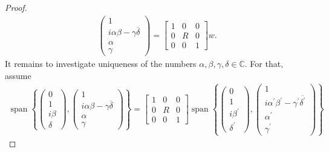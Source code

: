 \documentclass{amsart}
\newcommand{\C}{\mathbb{C}}
\DeclareMathOperator{\spann}{span}
\begin{document}
\begin{proof}
    \begin{align*}
        \begin{pmatrix}
                1 \\ i \alpha \beta - \gamma \overline{\delta} \\ \alpha \\ \gamma
            \end{pmatrix}
        =
        \left[\begin{array}{c|c|c}
            1& 0 & 0 \\
            \hline
            0 & R & 0 \\
            \hline 
            0 & 0 & 1
            \end{array}\right]
            w.
    \end{align*}
    It remains to investigate uniqueness of the numbers $\alpha, \beta, \gamma, \delta \in \C$. 
    For that, assume
    \begin{align*}
        \spann \left\{ \begin{pmatrix}
            0 \\ 1 \\ i \beta \\ \delta
        \end{pmatrix}, \begin{pmatrix}
            1 \\ i \alpha \beta - \gamma \overline{\delta} \\ \alpha \\ \gamma
        \end{pmatrix} \right\}
        = 
        \left[\begin{array}{c|c|c}
            1& 0 & 0 \\
            \hline
            0 & R & 0 \\
            \hline 
            0 & 0 & 1
            \end{array}\right]
            \spann \left\{ \begin{pmatrix}
                0 \\ 1 \\ i \beta^\prime \\ \delta^\prime
            \end{pmatrix}, \begin{pmatrix}
                1 \\ i \alpha^\prime \beta^\prime - \gamma^\prime \overline{\delta^\prime} \\ \alpha^\prime \\ \gamma^\prime
            \end{pmatrix} \right\}

\end{align*}
\end{proof}
\end{document}
